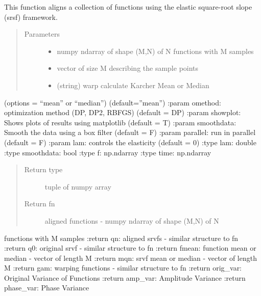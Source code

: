 \documentclass[letterpaper,10pt,english]{sphinxmanual}
\begin{document}
\begin{fulllineitems}
\label{\detokenize{time_warping:time_warping.srsf_align}}
This function aligns a collection of functions using the elastic
square-root slope (srsf) framework.
\begin{quote}\begin{description}
\item[{Parameters}] \leavevmode\begin{itemize}
\item {} 
 \textendash{} numpy ndarray of shape (M,N) of N functions with M samples

\item {} 
 \textendash{} vector of size M describing the sample points

\item {} 
 \textendash{} (string) warp calculate Karcher Mean or Median

\end{itemize}

\end{description}\end{quote}

(options = “mean” or “median”) (default=”mean”)
:param omethod: optimization method (DP, DP2, RBFGS) (default = DP)
:param showplot: Shows plots of results using matplotlib (default = T)
:param smoothdata: Smooth the data using a box filter (default = F)
:param parallel: run in parallel (default = F)
:param lam: controls the elasticity (default = 0)
:type lam: double
:type smoothdata: bool
:type f: np.ndarray
:type time: np.ndarray
\begin{quote}\begin{description}
\item[{Return type}] \leavevmode
tuple of numpy array

\item[{Return fn}] \leavevmode
aligned functions - numpy ndarray of shape (M,N) of N

\end{description}\end{quote}

functions with M samples
:return qn: aligned srvfs - similar structure to fn
:return q0: original srvf - similar structure to fn
:return fmean: function mean or median - vector of length M
:return mqn: srvf mean or median - vector of length M
:return gam: warping functions - similar structure to fn
:return orig\_var: Original Variance of Functions
:return amp\_var: Amplitude Variance
:return phase\_var: Phase Variance


\end{fulllineitems}
\end{document}
